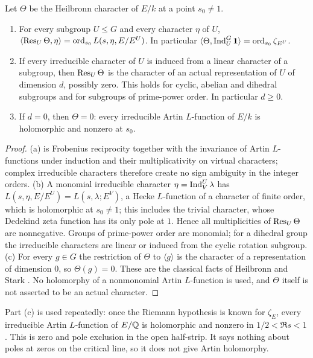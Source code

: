 \begin{lemma}\label{nab:lem:heilbronn}
Let $\Theta$ be the Heilbronn character of $E/k$ at a point $s_0\ne1$.
\begin{enumerate}[label=\textup{(\alph*)}]
\item For every subgroup $U\le G$ and every character $\eta$ of $U$,
$\langle\operatorname{Res}_U\Theta,\eta\rangle=\operatorname{ord}_{s_0}L(s,\eta,E/E^U)$. In particular
$\langle\Theta,\operatorname{Ind}_U^G\mathbf{1}\rangle=\operatorname{ord}_{s_0}\zeta_{E^U}$.
\item If every irreducible character of $U$ is induced from a linear character of a
subgroup, then $\operatorname{Res}_U\Theta$ is the character of an actual representation of $U$ of
dimension $d$, possibly zero. This holds for cyclic, abelian and dihedral subgroups and for
subgroups of prime-power order. In particular $d\ge0$.
\item If $d=0$, then $\Theta=0$: every irreducible Artin $L$-function of $E/k$ is
holomorphic and nonzero at $s_0$.
\end{enumerate}
\end{lemma}
\begin{proof}
(a) is Frobenius reciprocity together with the invariance of Artin $L$-functions under
induction and their multiplicativity on virtual characters; complex irreducible characters
therefore create no sign ambiguity in the integer orders. (b) A monomial irreducible
character $\eta=\operatorname{Ind}_V^U\lambda$ has $L(s,\eta,E/E^U)=L(s,\lambda;E^V)$, a Hecke
$L$-function of a character of finite order, which is holomorphic at $s_0\ne1$; this
includes the trivial character, whose Dedekind zeta function has its only pole at $1$.
Hence all multiplicities of $\operatorname{Res}_U\Theta$ are nonnegative. Groups of prime-power order
are monomial; for a dihedral group the irreducible characters are linear or induced from
the cyclic rotation subgroup. (c) For every $g\in G$ the restriction of $\Theta$ to
$\langle g\rangle$ is the character of a representation of dimension $0$, so
$\Theta(g)=0$. These are the classical facts of Heilbronn and Stark
\cite{Heilbronn1973Real,FooteGinsbergMurty2015Heilbronn}. No holomorphy of a nonmonomial
Artin $L$-function is used, and $\Theta$ itself is not asserted to be an actual character.
\end{proof}

Part (c) is used repeatedly: once the Riemann hypothesis is known for $\zeta_E$, every
irreducible Artin $L$-function of $E/\mathbb{Q}$ is holomorphic and nonzero in $1/2<\Re s<1$. This
is zero and pole exclusion in the open half-strip. It says nothing about poles at zeros on
the critical line, so it does not give Artin holomorphy.

